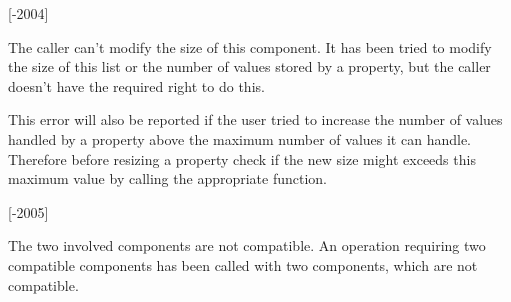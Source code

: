 \begin{Desc}
\begin{description}
{\bfseries }\mbox{[}-\/2004\mbox{]} \item[{\em 
\hypertarget{group___common_interface_gga61b0634ab285d9a2a303e0092167127ea998aac17e197fb0bc79f65493814ec19}{P\+R\+O\+P\+H\+A\+N\+D\+L\+I\+N\+G\+\_\+\+N\+O\+\_\+\+M\+O\+D\+I\+F\+Y\+\_\+\+S\+I\+Z\+E\+\_\+\+R\+I\+G\+H\+T\+S}\label{group___common_interface_gga61b0634ab285d9a2a303e0092167127ea998aac17e197fb0bc79f65493814ec19}
}]The caller can't modify the size of this component. It has been tried to modify the size of this list or the number of values stored by a property, but the caller doesn't have the required right to do this.

This error will also be reported if the user tried to increase the number of values handled by a property above the maximum number of values it can handle. Therefore before resizing a property check if the new size might exceeds this maximum value by calling the appropriate function.

{\bfseries }\mbox{[}-\/2005\mbox{]} \item[{\em 
\hypertarget{group___common_interface_gga61b0634ab285d9a2a303e0092167127ea7375efde32d2225a22dacb9b796957e1}{P\+R\+O\+P\+H\+A\+N\+D\+L\+I\+N\+G\+\_\+\+I\+N\+C\+O\+M\+P\+A\+T\+I\+B\+L\+E\+\_\+\+C\+O\+M\+P\+O\+N\+E\+N\+T\+S}\label{group___common_interface_gga61b0634ab285d9a2a303e0092167127ea7375efde32d2225a22dacb9b796957e1}
}]The two involved components are not compatible. An operation requiring two compatible components has been called with two components, which are not compatible.


\end{description}
\end{Desc}
